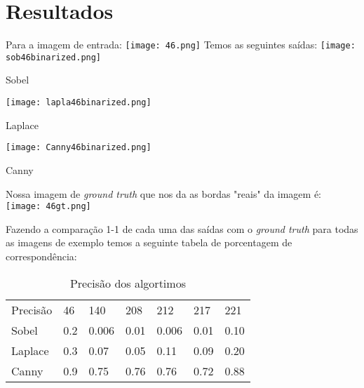 \documentclass[conference,harvard,brazil,english]{sbatex}
\begin{document}
	\section{Resultados}
		Para a imagem de entrada:\newline\newline
		\texttt{[image: 46.png]}\newline\newline\newline
		Temos as seguintes saídas:\newline\newline
		\texttt{[image: sob46binarized.png]}
		\centerline{Sobel}\newline\newline\newline
		\texttt{[image: lapla46binarized.png]}
		\centerline{Laplace}\newline\newline\newline
		\texttt{[image: Canny46binarized.png]}
		\centerline{Canny}\newline\newline\newline
		\par Nossa imagem de \textit{ground truth} que nos da as bordas "reais" da imagem é:\newline\newline\newline
		\texttt{[image: 46gt.png]}
		\par Fazendo a comparação 1-1 de cada uma das saídas com o \textit{ground truth} para todas as imagens de exemplo temos a seguinte tabela de porcentagem de correspondência:
		\begin{table}[h]
			\centering
			\caption{Precisão dos algortimos}
			\label{my-label}
			\begin{tabular}{lllllll}
				Precisão & 46 & 140 & 208 & 212 & 217 & 221 \\
				Sobel    & 0.2&0.006& 0.01&0.006& 0.01& 0.10\\
				Laplace  & 0.3& 0.07& 0.05& 0.11& 0.09& 0.20\\
				Canny    & 0.9&0.75 & 0.76& 0.76& 0.72& 0.88
			\end{tabular}
		\end{table}
\end{document}
